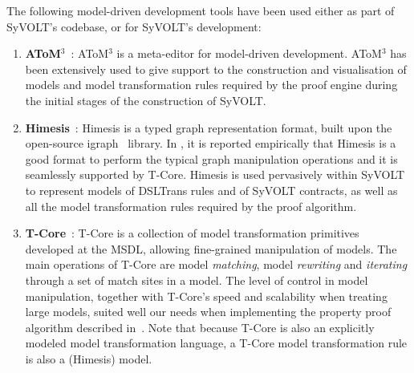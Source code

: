 The following model-driven development tools have been used either as part of
SyVOLT's codebase, or for SyVOLT's development:
\begin{enumerate}

  \item \textbf{AToM$^3$}~\cite{atom3:2002}: AToM$^3$ is a meta-editor for
  model-driven development.
  AToM$^3$ has been extensively used to give support to the construction and
  visualisation of models and model transformation rules required by the proof
  engine during the initial stages of the construction of SyVOLT. 

  \item \textbf{Himesis}~\cite{Provost2006}: Himesis is a typed graph representation
  format, built upon the open-source igraph~\cite{igraphTool} library. 
In \cite{Syriani2010b}, it is reported empirically that Himesis is a good format
to perform the typical graph manipulation operations and it is seamlessly
supported by T-Core.  
  Himesis is used pervasively within SyVOLT to represent models of 
  DSLTrans rules and of SyVOLT contracts, as well as all the model
  transformation rules required by the proof algorithm.
  
  \item \textbf{T-Core}~\cite{Syriani2010a}: T-Core is a collection of model transformation
  primitives developed at the MSDL, allowing fine-grained manipulation of
  models.
  The main operations of T-Core are model \emph{matching},
  model \emph{rewriting} and \emph{iterating} through a set of match sites in a model.
  The level of control in model manipulation, together with T-Core's speed and
  scalability when treating large models, suited well our needs when
  implementing the property proof algorithm described in~\cite{Lucio2014}. Note that because
  T-Core is also an explicitly modeled model transformation language, a T-Core
  model transformation rule is also a (Himesis) model.


\end{enumerate}
